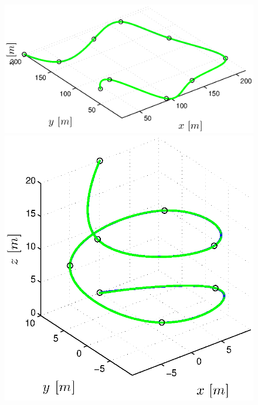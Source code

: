 \begin{figure}[H]
  \begin{minipage}[t]{0.32\textwidth}
    \includegraphics[width = \textwidth]{trackings/figure_3D_road_SplineDegree3_trajectoryFollowing_Disturbance_0}
  \end{minipage}
  \hfill
  \begin{minipage}[t]{0.32\textwidth}
    \includegraphics[width = \textwidth]{trackings/figure_3D_helix_SplineDegree3_trajectoryFollowing_Disturbance_0}
  \end{minipage}
  \hfill
  \begin{minipage}[t]{0.32\textwidth}

\end{minipage}
\end{figure}
